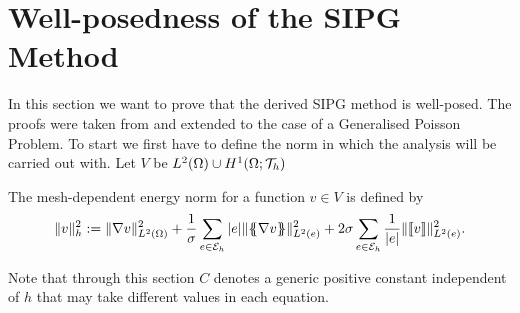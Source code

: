 

\section{Well-posedness of the SIPG Method}

In this section we want to prove that the derived SIPG method is well-posed. The proofs were taken from \cite{BS2002, PPO+2000} and extended to the case of a Generalised Poisson Problem. 
To start we first have to define the norm in which the analysis will be carried out with. Let $V$ be $L^2(\Omega) \cup H^1(\Omega; \mathcal{T}_h)$ 
\begin{definition} \label{def: energy norm}
	The mesh-dependent energy norm for a function $v \in V$ is defined by
	\[
	\lVert v \rVert_{h} ^2 := \lVert \nabla v \rVert_{L^2(\Omega)}^2 + \frac 1 \sigma \sum_{e \in \mathcal{E}_h} |e|\lVert \{\!\!\{ \nabla v \}\!\!\} \rVert_{L^2(e)}^2 + 2 \sigma \sum_{e \in \mathcal{E}_h} \frac 1 {|e|}\lVert \llbracket v \rrbracket \rVert_{L^2(e)}^2.
	\]
\end{definition}

Note that through this section $C$ denotes a generic positive constant independent of $h$ that may take different values in each equation.

